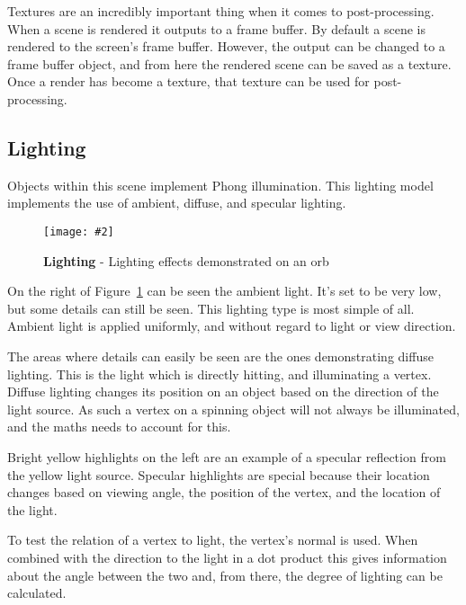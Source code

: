 \documentclass[10pt, a4paper]{article}
\newcommand{\figuremacro}[5]{
    \begin{figure}[#1]
        \centering
        \texttt{[image: \#2]}
        \caption[#3]{\textbf{#3}#4}
        \label{fig:#2}
    \end{figure}
}
\begin{document}
	Textures are an incredibly important thing when it comes to post-processing.  When a scene is rendered it outputs to a frame buffer.  By default a scene is rendered to the screen's frame buffer.  However, the output can be changed to a frame buffer object, and from here the rendered scene can be saved as a texture.  Once a render has become a texture, that texture can be used for post-processing.
	
	\subsection{Lighting}
	Objects within this scene implement Phong illumination.  This lighting model implements the use of ambient, diffuse, and specular lighting.
	\figuremacro{h}{Phong_demo}{Lighting}{ - Lighting effects demonstrated on an orb}{1.0}
	
	On the right of Figure~\ref{fig:Phong_demo} can be seen the ambient light.  It's set to be very low, but some details can still be seen.  This lighting type is most simple of all.  Ambient light is applied uniformly, and without regard to light or view direction.
	
	The areas where details can easily be seen are the ones demonstrating diffuse lighting.  This is the light which is directly hitting, and illuminating a vertex.  Diffuse lighting changes its position on an object based on the direction of the light source.  As such a vertex on a spinning object will not always be illuminated, and the maths needs to account for this.
	
	Bright yellow highlights on the left are an example of a specular reflection from the yellow light source.  Specular highlights are special because their location changes based on viewing angle, the position of the vertex, and the location of the light.
	
	To test the relation of a vertex to light, the vertex's normal is used.  When combined with the direction to the light in a dot product this gives information about the angle between the two and, from there, the degree of lighting can be calculated.
	
\end{document}
